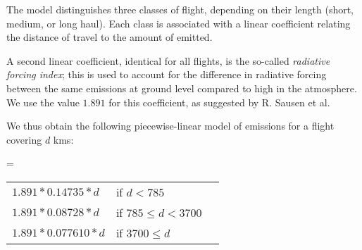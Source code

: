 The model distinguishes three classes of flight, depending on their length
(short, medium, or long haul). Each class is associated with a linear
coefficient relating the distance of travel to the amount of \gaz{}
emitted.

A second linear coefficient, identical for all flights, is the so-called
\emph{radiative forcing index}; this is used to account for the difference
in radiative forcing between the same emissions at ground level compared to
high in the atmosphere.  We use the value $1.891$ for this coefficient, as
suggested by R. Sausen et al.~\cite{Sausen05}

We thus obtain the following piecewise-linear model of emissions for a
flight covering $d$ kms:

\begin{center}
\gazunit \quad=\quad
\begin{tabular}{@{}lll}
$1.891 * 0.14735 * d$ & if $d < 785$ \\
$1.891 * 0.08728 * d$ & if $785 \leq d < 3700$ \\
$1.891 * 0.077610 * d$ & if $3700\leq d  $
\end{tabular}
\end{center}



